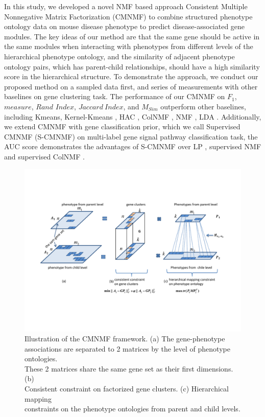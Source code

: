 \documentclass{bmcart}
\begin{document}
In this study, we developed a novel NMF based approach Consistent Multiple Nonnegative Matrix Factorization (CMNMF) to combine structured phenotype ontology data on mouse disease phenotype to predict disease-associated gene modules. The key ideas of our method are that the same gene should be active in the same modules when interacting with phenotypes from different levels of the hierarchical phenotype ontology, and the similarity of adjacent phenotype ontology pairs, which has parent-child relationships, should have a high similarity score in the hierarchical structure. To demonstrate the approach, we conduct our proposed method on a sampled data first, and series of measurements with other baselines on gene clustering task. The performance of our CMNMF on $F_1$, $measure$, $Rand$ $Index$, $Jaccard\ Index$, and $M_{Sim}$ outperform other baselines, including Kmeans, Kernel-Kmeans \cite{Dhillon2004}, HAC \cite{Ward1963}, ColNMF \cite{Singh2008}, NMF \cite{Lee1999}, LDA \cite{Blei2003}. Additionally, we extend CMNMF with gene classification prior, which we call Supervised CMNMF (S-CMNMF) on multi-label gene signal pathway classification task, the AUC score demonstrates the advantages of S-CMNMF over LP \cite{Raghavan2007}, supervised NMF and supervised ColNMF \cite{Singh2008}.
\begin{figure}[!t]
  \centering
  \begin{minipage}{.80\linewidth}
  \centering
    \includegraphics[width=\linewidth]{DrawPictures/module2.pdf}
  \end{minipage}
  \caption{Illustration of the CMNMF framework. (a) The gene-phenotype \\ associations are separated to 2 matrices by the level of phenotype ontologies. \\These 2 matrices share the same gene set as their first dimensions. (b)\\ Consistent constraint on factorized gene clusters. (c) Hierarchical mapping \\ constraints on the phenotype ontologies from parent and child levels.}
  \label{fig:model}
\end{figure}
\end{document}
